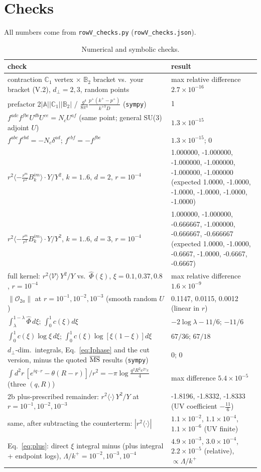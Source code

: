 \documentclass[10pt]{article}
\numberwithin{equation}{section}
\newcommand{\Ph}{\hat\Phi}
\newcommand{\OO}{\mathcal O}
\newcommand{\VV}{\mathcal V}
\def\mf#1{\mathbb{#1}}
\begin{document}
\section{Checks}\label{sec:checks}
All numbers come from \texttt{rowV\_checks.py} (\texttt{rowV\_checks.json}).
\begin{table}[H]
\centering\small
\begin{tabular}{@{}p{} p{}@{}}
check & result\\ \hline
contraction $\mf C_1$ vertex $\times$ $\mf B_2$ bracket vs.\ your bracket (V.2), $d_\perp=2,3$, random points & max relative difference $2.7\times10^{-16}$\\
prefactor $2|\mf A||\mf C_1||\mf B_2|$ / $\frac{g^4}{8\pi^4}\frac{p^+(k^+-p^+)}{k^{+3}D}$ (\texttt{sympy}) & 1\\
$f^{adc}f^{fbe}U^{db}U^{ce}=N_cU^{af}$ (same point; general SU(3) adjoint $U$) & $1.3\times10^{-15}$\\
$f^{abc}f^{cbd}=-N_c\delta^{ad}$; $f^{ebf}=-f^{fbe}$ & $1.3\times10^{-15}$; $0$\\
$r^2\langle-\frac{r^m}{r^2}B_k^{im}\rangle\cdot Y/Y^2$, $k=1..6$, $d=2$, $r=10^{-4}$ & 1.000000, -1.000000, -1.000000, -1.000000, -1.000000, -1.000000 (expected 1.0000, -1.0000, -1.0000, -1.0000, -1.0000, -1.0000)\\
$r^2\langle-\frac{r^m}{r^2}B_k^{im}\rangle\cdot Y/Y^2$, $k=1..6$, $d=3$, $r=10^{-4}$ & 1.000000, -1.000000, -0.666667, -1.000000, -0.666667, -0.666667 (expected 1.0000, -1.0000, -0.6667, -1.0000, -0.6667, -0.6667)\\
full kernel: $r^2\langle\VV\rangle\,Y^2/Y$ vs.\ $\Ph(\xi)$, $\xi=0.1,0.37,0.8$, $r=10^{-4}$ & max relative difference $1.6\times10^{-9}$\\
$\|\OO_{2a}\|$ at $r=10^{-1},10^{-2},10^{-3}$ (smooth random $U$) & 0.1147, 0.0115, 0.0012 (linear in $r$)\\
$\int_\lambda^{1-\lambda}\Ph\,d\xi$; $\int_0^1c(\xi)d\xi$ & $-2\log\lambda - 11/6$; $-11/6$\\
$\int_0^1c(\xi)\log\xi\,d\xi$; $\int_0^1c(\xi)\log[\xi(1-\xi)]d\xi$ & $67/36$; $67/18$\\
$d_\perp$-dim.\ integrals, Eq.~\eqref{eq:Iphase} and the cut version, minus the quoted $\overline{\rm MS}$ results (\texttt{sympy}) & 0; 0\\
$\int d^2r\,[e^{iq\cdot r}-\theta(R-r)]/r^2=-\pi\log\frac{q^2R^2e^{2\gamma_E}}{4}$ (three $(q,R)$) & max difference $5.4\times10^{-5}$\\
2b plus-prescribed remainder: $r^2\langle\cdot\rangle\,Y^2/Y$ at $r=10^{-1},10^{-2},10^{-3}$ & -1.8196, -1.8332, -1.8333 (UV coefficient $-\frac{11}{6}$)\\
same, after subtracting the counterterm: $|r^2\langle\cdot\rangle|$ & $1.1\times10^{-2}$, $1.1\times10^{-4}$, $1.1\times10^{-6}$ (UV finite)\\
Eq.~\eqref{eq:plus}: direct $\xi$ integral minus (plus integral + endpoint logs), $\Lambda/k^+=10^{-2},10^{-3},10^{-4}$ & $4.9\times10^{-3}$, $3.0\times10^{-4}$, $2.2\times10^{-5}$ (relative), $\propto\Lambda/k^+$\\
\end{tabular}
\caption{Numerical and symbolic checks.}
\label{tab:checks}
\end{table}
\end{document}
